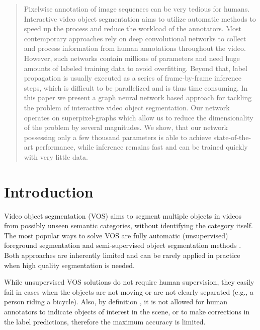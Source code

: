 \documentclass[conference]{IEEEtran}
\begin{document}
\begin{abstract}

Pixelwise annotation of image sequences can be very tedious for humans. Interactive video object segmentation aims to utilize automatic methods to speed up the process and reduce the workload of the annotators. Most contemporary approaches rely on deep convolutional networks to collect and process information from human annotations throughout the video. However, such networks contain millions of parameters and need huge amounts of labeled training data to avoid overfitting. Beyond that, label propagation is usually executed as a series of frame-by-frame inference steps, which is difficult to be parallelized and is thus time consuming.
In this paper we present a graph neural network based approach for tackling the problem of interactive video object segmentation. Our network operates on superpixel-graphs which allow us to reduce the dimensionality of the problem by several magnitudes. We show, that our network possessing only a few thousand parameters is able to achieve state-of-the-art performance, while inference remains fast and can be trained quickly with very little data.

\end{abstract}

\section{Introduction}

Video object segmentation (VOS) aims to segment multiple objects in videos from possibly unseen semantic categories, without identifying the category itself. The most popular ways to solve VOS are fully automatic (unsupervised) foreground segmentation and semi-supervised object segmentation methods \cite{vos_survey}. Both approaches are inherently limited and can be rarely applied in practice when high quality segmentation is needed. 

While unsupervised VOS solutions do not require human supervision, they easily fail in cases when the objects are not moving or are not clearly separated (e.g., a person riding a bicycle). Also, by definition \cite{davis_challenge17, youtube_vos}, it is not allowed for human annotators to indicate objects of interest in the scene, or to make corrections in the label predictions, therefore the maximum accuracy is limited.
\end{document}
